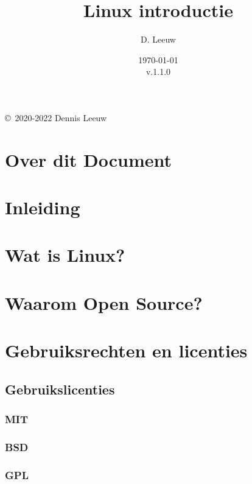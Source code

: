 \documentclass[a4paper,12pt,twoside,openright,titlepage]{book}
\author{D. Leeuw}
\title{Linux introductie}
\date{\today\\v.1.1.0}
\begin{document}

\maketitle

\copyright\ 2020-2022 Dennis Leeuw\\




\frontmatter
\chapter{Over dit Document}



\tableofcontents

\mainmatter
\chapter{Inleiding}


\chapter{Wat is Linux?}


\chapter{Waarom Open Source?}


\chapter{Gebruiksrechten en licenties}

\section{Gebruikslicenties}
\subsection{MIT}

\subsection{BSD}

\subsection{GPL}

\end{document}
